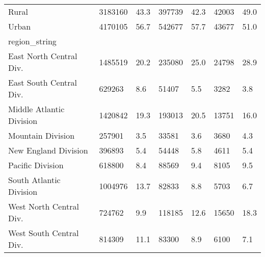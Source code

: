 \begin{longtable}{lllllll}
\midrule
Rural & 3183160 & 43.3 & 397739 & 42.3 & 42003 & 49.0 \\ 
Urban & 4170105 & 56.7 & 542677 & 57.7 & 43677 & 51.0 \\ 
\midrule
\multicolumn{1}{l}{region\_string} \\ 
\midrule
East North Central Div. & 1485519 & 20.2 & 235080 & 25.0 & 24798 & 28.9 \\ 
East South Central Div. & 629263 & 8.6 & 51407 & 5.5 & 3282 & 3.8 \\ 
Middle Atlantic Division & 1420842 & 19.3 & 193013 & 20.5 & 13751 & 16.0 \\ 
Mountain Division & 257901 & 3.5 & 33581 & 3.6 & 3680 & 4.3 \\ 
New England Division & 396893 & 5.4 & 54448 & 5.8 & 4611 & 5.4 \\ 
Pacific Division & 618800 & 8.4 & 88569 & 9.4 & 8105 & 9.5 \\ 
South Atlantic Division & 1004976 & 13.7 & 82833 & 8.8 & 5703 & 6.7 \\ 
West North Central Div. & 724762 & 9.9 & 118185 & 12.6 & 15650 & 18.3 \\ 
West South Central Div. & 814309 & 11.1 & 83300 & 8.9 & 6100 & 7.1 \\ 
\bottomrule
\end{longtable}

